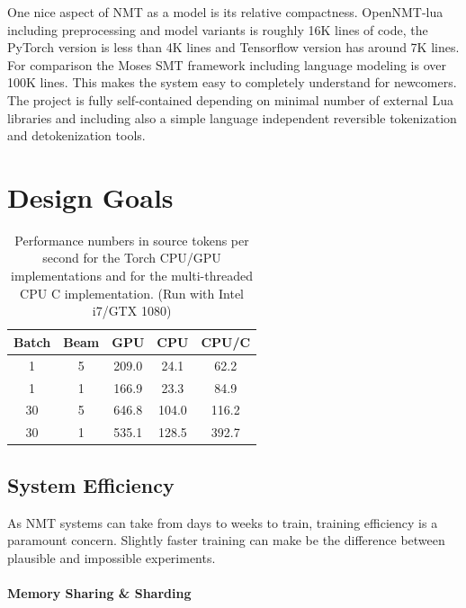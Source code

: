 \documentclass[]{article}
\begin{document}
One nice aspect of NMT as a model is its relative compactness.
OpenNMT-lua including preprocessing and model variants is roughly 16K lines of code,
the PyTorch version is less than 4K lines and Tensorflow version has around 7K lines. For comparison the Moses SMT framework
including language modeling is over 100K lines. This makes the system
easy to completely understand for newcomers. The project is fully
self-contained depending on minimal number of external Lua libraries
and including also a simple language independent reversible
tokenization and detokenization tools.


\section{Design Goals}

\begin{table}
  \centering
  \begin{tabular}{ccccc}
    \toprule
    Batch & Beam & GPU & CPU & CPU/C \\ 
    \midrule
    1  & 5 & 209.0 & 24.1 & 62.2\\
    1  & 1 & 166.9 & 23.3 & 84.9\\
    30 & 5 & 646.8 & 104.0 & 116.2\\
    30 & 1 & 535.1 & 128.5  & 392.7\\

    \bottomrule
  \end{tabular}

  \label{tab:cpu}
  \caption{\small Performance numbers in source tokens per second for the Torch CPU/GPU implementations and for 
  the  multi-threaded CPU C implementation. (Run with Intel i7/GTX 1080)}
\end{table}
\subsection{System Efficiency}

As NMT systems can take from days to weeks to train, training
efficiency is a paramount concern. Slightly faster training can make be the difference between
plausible and impossible experiments.

\paragraph{Memory Sharing \& Sharding}
\end{document}

